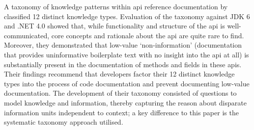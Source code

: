 A taxonomy of knowledge patterns within \gls{api} reference documentation by \citet{Maalej2013} classified 12 distinct knowledge types. Evaluation of the taxonomy against JDK 6 and .NET 4.0 showed that, while functionality and structure of the \gls{api} is well-communicated, core concepts and rationale about the \gls{api} are quite rare to find. Moreover, they demonstrated that low-value `non-information' (documentation that provides uninformative boilerplate text with no insight into the \gls{api} at all) is substantially present in the documentation of methods and fields in these \glspl{api}. Their findings recommend that developers factor their 12 distinct knowledge types into the process of code documentation and prevent documenting low-value documentation. The development of their taxonomy consisted of questions to model knowledge and information, thereby capturing the reason about disparate information units independent to context; a key difference to this paper is the systematic taxonomy approach utilised.



%




